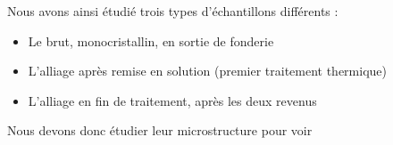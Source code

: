 Nous avons ainsi étudié trois types d'échantillons différents : 
\begin{itemize}
    \item Le brut, monocristallin, en sortie de fonderie
    \item L'alliage après remise en solution (premier traitement thermique)
    \item L'alliage en fin de traitement, après les deux revenus
\end{itemize}

Nous devons donc étudier leur microstructure pour voir 
